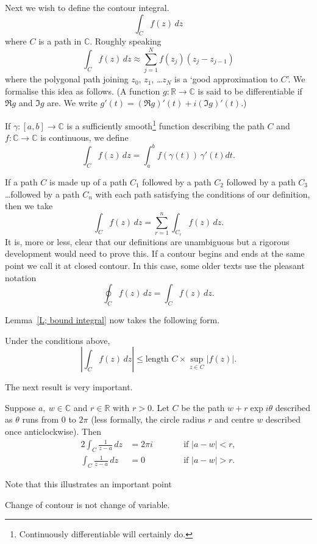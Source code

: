 Next we wish to define the contour integral.
\[\int_{C}f(z)\,dz\]
where $C$ is a path in $\mathbb C$.
Roughly speaking 
\[\int_{C}f(z)\,dz\approx\sum_{j=1}^{N}f(z_{j})(z_{j}-z_{j-1})\]
where the polygonal path joining $z_{0}$, $z_{1}$,
\dots $z_{N}$ is a `good approximation to $C$'.
We formalise this idea as follows.
(A function $g:{\mathbb R}\rightarrow{\mathbb C}$ is said
to be differentiable if $\Re g$ and $\Im g$ are.
We write $g'(t)=(\Re g)'(t)+i(\Im g)'(t)$.)
\begin{definition} If $\gamma:[a,b]\rightarrow{\mathbb C}$
is a sufficiently smooth\footnote{Continuously differentiable
will certainly do.} function describing the path $C$
and $f:{\mathbb C}\rightarrow{\mathbb C}$ is continuous,
we define
\[\int_{C}f(z)\,dz=\int_{a}^{b}f(\gamma(t))\,\gamma'(t)dt.\]
\end{definition}
If a path $C$ is made up of a path $C_{1}$ followed by a path $C_{2}$
followed by a path $C_{3}$ \dots followed by a path $C_{n}$
with each path satisfying the conditions of our definition,
then we take
\[\int_{C}f(z)\,dz=\sum_{r=1}^{n}\int_{C_{r}}f(z)\,dz.\] 
It is, more or less, clear that our definitions are unambiguous
but a rigorous development would need to prove this. 
If a contour begins and ends at the same point
we call it at closed contour. In this case,
some older texts use the
pleasant notation
\[\oint_{C}f(z)\,dz=\int_{C}f(z)\,dz.\]

Lemma~\ref{L; bound integral} now takes the following form.
\begin{lemma} Under the conditions above,
\[\left|\int_{C}f(z)\,dz\right|\leq \text{length $C$}\times
\sup_{z\in C}|f(z)|.\]
\end{lemma}

The next result is very important.
\begin{lemma}\label{L; simplest pole} 
Suppose $a,\ w\in{\mathbb C}$ and $r\in{\mathbb R}$
with $r>0$.
Let $C$ be the path $w+r\exp i\theta$ described
as $\theta$ runs from $0$ to $2\pi$ (less formally, the
circle radius $r$ and centre $w$ described once anticlockwise). 
Then
\begin{alignat*}{2}
\int_{C}\frac{1}{z-a}\,dz&=2\pi i&&\qquad\text{if $|a-w|<r$},\\
\int_{C}\frac{1}{z-a}\,dz&=0&&\qquad\text{if $|a-w|>r$}.
\end{alignat*}
\end{lemma}
Note that this illustrates an important point
\begin{center}
\begin{bf} 
Change of contour is not change of variable.
\end{bf}
\end{center}

